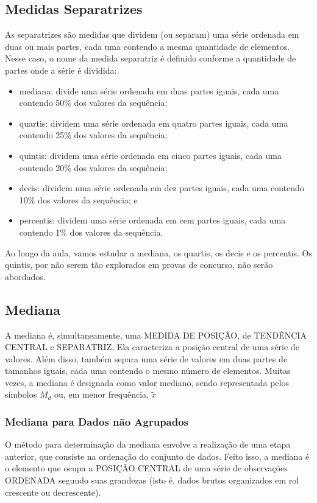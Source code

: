 
\subsection{Medidas Separatrizes}
As separatrizes são medidas que dividem (ou separam) uma série ordenada em duas ou mais partes, cada uma contendo a mesma quantidade de elementos. Nesse caso, o nome da medida separatriz é definido conforme a quantidade de partes onde a série é dividida:

\begin{itemize}
    \item mediana: divide uma série ordenada em duas partes iguais, cada uma contendo 50\% dos valores da sequência;
    \item quartis: dividem uma série ordenada em quatro partes iguais, cada uma contendo 25\% dos valores da sequência;
    \item quintis: dividem uma série ordenada em cinco partes iguais, cada uma contendo 20\% dos valores da sequência;
    \item decis: dividem uma série ordenada em dez partes iguais, cada uma contendo 10\% dos valores da sequência; e
    \item percentis: dividem uma série ordenada em cem partes iguais, cada uma contendo 1\% dos valores da sequência.
\end{itemize}

Ao longo da aula, vamos estudar a mediana, os quartis, os decis e os percentis. Os quintis, por não serem tão explorados em provas de concurso, não serão abordados.

\subsection{Mediana}

A mediana é, simultaneamente, uma MEDIDA DE POSIÇÃO, de TENDÊNCIA CENTRAL e SEPARATRIZ. Ela caracteriza a posição central de uma série de valores. Além disso, também separa uma série de valores em duas partes de tamanhos iguais, cada uma contendo o mesmo número de elementos. Muitas vezes, a mediana é designada como valor mediano, sendo representada pelos símbolos \(M_d\) ou, em menor frequência, \(\tilde{x}\)

\subsubsection{Mediana para Dados não Agrupados}
O método para determinação da mediana envolve a realização de uma etapa anterior, que consiste na ordenação do conjunto de dados. Feito isso, a mediana é o elemento que ocupa a POSIÇÃO CENTRAL de uma série de observações ORDENADA segundo suas grandezas (isto é, dados brutos organizados em rol crescente ou decrescente).

